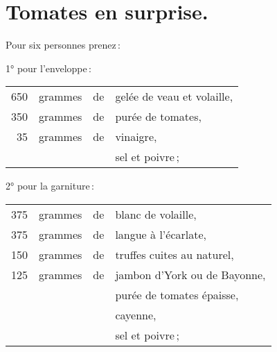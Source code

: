 \section*{\centering Tomates en surprise.}
{}

Pour six personnes prenez :

1° pour l'enveloppe :

\medskip

\footnotesize
\begin{longtable}{rrrp{16em}}
    650 & grammes & de & gelée de veau et volaille,                                                       \\
    350 & grammes & de & purée de tomates,                                                                \\
     35 & grammes & de & vinaigre,                                                                        \\
        &         &    & sel et poivre ;                                                                  \\
\end{longtable}
\normalsize

2° pour la garniture :

\footnotesize
\begin{longtable}{rrrp{16em}}
    375 & grammes & de & blanc de volaille,                                                               \\
    375 & grammes & de & langue à l'écarlate,                                                             \\
    150 & grammes & de & truffes cuites au naturel,                                                       \\
    125 & grammes & de & jambon d'York ou de Bayonne,                                                     \\
        &         &    & purée de tomates épaisse,                                                        \\
        &         &    & cayenne,                                                                         \\
        &         &    & sel et poivre ;                                                                  \\
\end{longtable}
\normalsize

